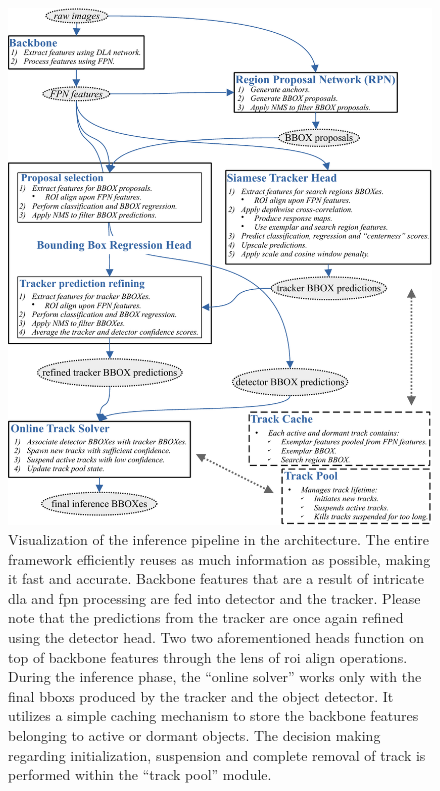 \begin{figure}[t]
    \centering
    \includegraphics[width=\linewidth]{figures/methodology/siammot_inference_diagram.pdf}
    \caption[\siammot{} inference diagram]{Visualization of the inference pipeline in the \siammot{} architecture. The entire framework efficiently reuses as much information as possible, making it fast and accurate. Backbone features that are a result of intricate \gls{dla} and \gls{fpn} processing are fed into detector and the tracker. Please note that the predictions from the tracker are once again refined using the detector head. Two two aforementioned heads function on top of backbone features through the lens of \gls{roi} align operations. During the inference phase, the ``online solver'' works only with the final \glspl{bbox} produced by the tracker and the object detector. It utilizes a simple caching mechanism to store the backbone features belonging to active or dormant objects. The decision making regarding initialization, suspension and complete removal of track is performed within the ``track pool'' module.}
    \label{fig:SiamMOTInference}
\end{figure}

